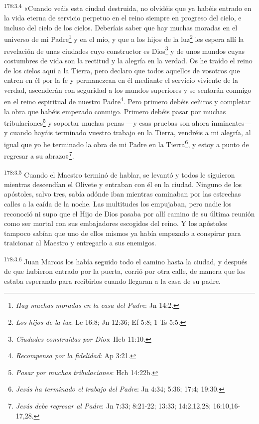 \par
\textsuperscript{178:3.4} «Cuando veáis esta ciudad destruida, no olvidéis que ya habéis entrado en la vida eterna de servicio perpetuo en el reino siempre en progreso del cielo, e incluso del cielo de los cielos. Deberíais saber que hay muchas moradas en el universo de mi Padre\footnote{\textit{Hay muchas moradas en la casa del Padre}: Jn 14:2.} y en el mío, y que a los hijos de la luz\footnote{\textit{Los hijos de la luz}: Lc 16:8; Jn 12:36; Ef 5:8; 1 Ts 5:5.} les espera allí la revelación de unas ciudades cuyo constructor es Dios\footnote{\textit{Ciudades construidas por Dios}: Heb 11:10.} y de unos mundos cuyas costumbres de vida son la rectitud y la alegría en la verdad. Os he traído el reino de los cielos aquí a la Tierra, pero declaro que todos aquellos de vosotros que entren en él por la fe y permanezcan en él mediante el servicio viviente de la verdad, ascenderán con seguridad a los mundos superiores y se sentarán conmigo en el reino espiritual de nuestro Padre\footnote{\textit{Recompensa por la fidelidad}: Ap 3:21.}. Pero primero debéis ceñiros y completar la obra que habéis empezado conmigo. Primero debéis pasar por muchas tribulaciones\footnote{\textit{Pasar por muchas tribulaciones}: Hch 14:22b.} y soportar muchas penas ---y esas pruebas son ahora inminentes--- y cuando hayáis terminado vuestro trabajo en la Tierra, vendréis a mi alegría, al igual que yo he terminado la obra de mi Padre en la Tierra\footnote{\textit{Jesús ha terminado el trabajo del Padre}: Jn 4:34; 5:36; 17:4; 19:30.}, y estoy a punto de regresar a su abrazo»\footnote{\textit{Jesús debe regresar al Padre}: Jn 7:33; 8:21-22; 13:33; 14:2,12,28; 16:10,16-17,28.}.

\par
\textsuperscript{178:3.5} Cuando el Maestro terminó de hablar, se levantó y todos le siguieron mientras descendían el Olivete y entraban con él en la ciudad. Ninguno de los apóstoles, salvo tres, sabía adónde iban mientras caminaban por las estrechas calles a la caída de la noche. Las multitudes los empujaban, pero nadie los reconoció ni supo que el Hijo de Dios pasaba por allí camino de su última reunión como ser mortal con sus embajadores escogidos del reino. Y los apóstoles tampoco sabían que uno de ellos mismos ya había empezado a conspirar para traicionar al Maestro y entregarlo a sus enemigos.

\par
\textsuperscript{178:3.6} Juan Marcos los había seguido todo el camino hasta la ciudad, y después de que hubieron entrado por la puerta, corrió por otra calle, de manera que los estaba esperando para recibirlos cuando llegaran a la casa de su padre.